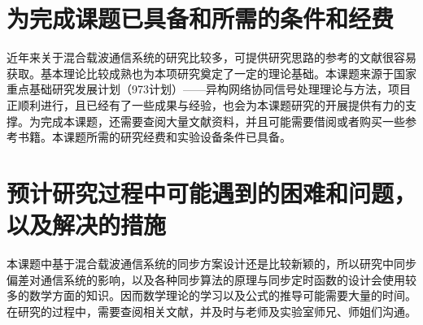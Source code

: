 \section{为完成课题已具备和所需的条件和经费}
近年来关于混合载波通信系统的研究比较多，可提供研究思路的参考的文献很容易获取。基本理论比较成熟也为本项研究奠定了一定的理论基础。本课题来源于国家重点基础研究发展计划（973计划）——异构网络协同信号处理理论与方法，项目正顺利进行，且已经有了一些成果与经验，也会为本课题研究的开展提供有力的支撑。为完成本课题，还需要查阅大量文献资料，并且可能需要借阅或者购买一些参考书籍。本课题所需的研究经费和实验设备条件已具备。


\section{预计研究过程中可能遇到的困难和问题，以及解决的措施}
本课题中基于混合载波通信系统的同步方案设计还是比较新颖的，所以研究中同步偏差对通信系统的影响，以及各种同步算法的原理与同步定时函数的设计会使用较多的数学方面的知识。因而数学理论的学习以及公式的推导可能需要大量的时间。在研究的过程中，需要查阅相关文献，并及时与老师及实验室师兄、师姐们沟通。
